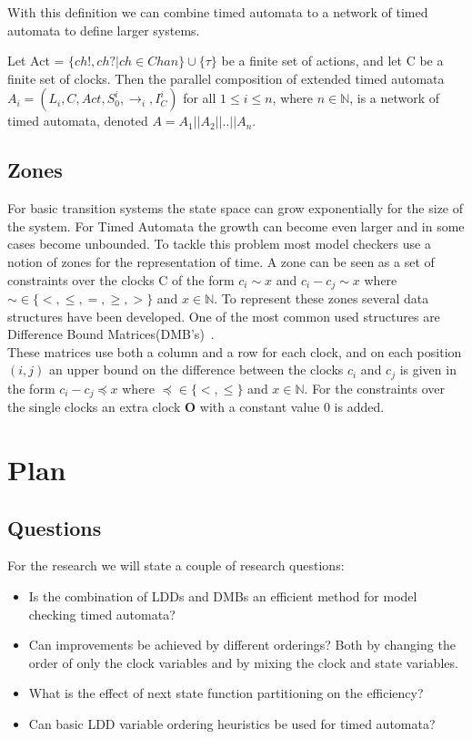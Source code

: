 \documentclass[11pt]{article}
\begin{document}
With this definition we can combine timed automata to a network of timed automata to define larger systems.

\begin{mydef}
\label{def:networkTA}
Let Act = $\{ch!,ch?|ch \in Chan\} \cup \{\tau\}$ be a finite set of actions, and let C be a finite set of clocks. Then the parallel composition of extended timed automata $A_i = (L_i, C, Act, S^i_0, \rightarrow_{i}, I^i_C)$ for all $1 \leq i \leq n$, where $n \in \mathbb{N}$, is a network of timed automata, denoted $A = A_1||A_2||..||A_n$.
\end{mydef}

\subsection{Zones}
For basic transition systems the state space can grow exponentially for the size of the system. For Timed Automata the growth can become even larger and in some cases become unbounded. To tackle this problem most model checkers use a notion of zones for the representation of time. A zone can be seen as a set of constraints over the clocks C of the form $c_i \sim x$ and $c_i - c_j \sim x$ where $\sim  \in \{<, \leq, =, \geq, >\}$ and $x \in \mathbb{N}$. To represent these zones several data structures have been developed. One of the most common used structures are Difference Bound Matrices(DMB's)~\cite{bengtsson2002clocks}.\\ 
These matrices use both a column and a row for each clock, and on each position $(i,j)$ an upper bound on the difference between the clocks $c_i$ and $c_j$ is given in the form $c_i - c_j \preceq x$ where $\preceq \in \{<, \leq\}$ and $x \in \mathbb{N}$. For the constraints over the single clocks an extra clock $\mathbf{O}$ with a constant value 0 is added.

\section{Plan}

\subsection{Questions}
For the research we will state a couple of research questions:
{\renewcommand\labelitemi{--}
	\begin{itemize}
		\item Is the combination of LDDs and DMBs an efficient method for model checking timed automata?
		\item Can improvements be achieved by different orderings? Both by changing the order of only the clock variables and by mixing the clock and state variables.
		\item What is the effect of next state function partitioning on the efficiency?
		\item Can basic LDD variable ordering heuristics be used for timed automata?
	\end{itemize}
}
\end{document}
